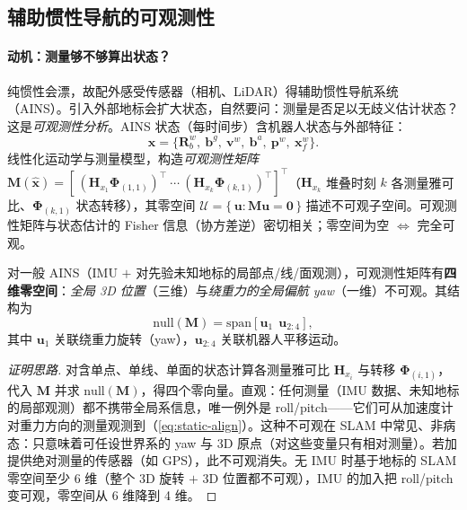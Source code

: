 \subsection{辅助惯性导航的可观测性}
\label{subsec:aided-obs}

\paragraph{动机：测量够不够算出状态？}
纯惯性会漂，故配外感受传感器（相机、LiDAR）得辅助惯性导航系统（AINS）。引入外部地标会扩大状态，自然要问：测量是否足以无歧义估计状态？这是\emph{可观测性分析}\cite{carlone2026handbook}。AINS 状态（每时间步）含机器人状态与外部特征：
\begin{equation}
  \boldsymbol x=\{\mathbf R_b^w,\ \mathbf b^g,\ \mathbf v^w,\ \mathbf b^a,\ \mathbf p^w,\ \boldsymbol x_f^w\}.
  \label{eq:ains-state}
\end{equation}
线性化运动学与测量模型，构造\emph{可观测性矩阵} $\mathbf M(\hat{\boldsymbol x})=[\,(\mathbf H_{x_1}\boldsymbol\Phi_{(1,1)})^\top\ \cdots\ (\mathbf H_{x_k}\boldsymbol\Phi_{(k,1)})^\top]^\top$（$\mathbf H_{x_k}$ 堆叠时刻 $k$ 各测量雅可比、$\boldsymbol\Phi_{(k,1)}$ 状态转移），其零空间 $\mathcal U=\{\,\boldsymbol u:\mathbf M\boldsymbol u=\mathbf 0\,\}$ 描述不可观子空间。可观测性矩阵与状态估计的 Fisher 信息（协方差逆）密切相关；零空间为空 $\iff$ 完全可观。

\begin{theorem}\label{thm:imu-obs}
对一般 AINS（IMU $+$ 对先验未知地标的局部点/线/面观测），可观测性矩阵有\textbf{四维零空间}：\emph{全局 3D 位置}（三维）与\emph{绕重力的全局偏航 yaw}（一维）不可观。其结构为
\[
  \mathrm{null}(\mathbf M)=\mathrm{span}[\boldsymbol u_1\ \ \boldsymbol u_{2:4}],
\]
其中 $\boldsymbol u_1$ 关联绕重力旋转（yaw），$\boldsymbol u_{2:4}$ 关联机器人平移运动\cite{carlone2026handbook}。
\end{theorem}

\begin{proof}[证明思路]
对含单点、单线、单面的状态计算各测量雅可比 $\mathbf H_{x_i}$ 与转移 $\boldsymbol\Phi_{(i,1)}$，代入 $\mathbf M$ 并求 $\mathrm{null}(\mathbf M)$，得四个零向量。直观：任何测量（IMU 数据、未知地标的局部观测）都不携带全局系信息，唯一例外是 roll/pitch——它们可从加速度计对重力方向的测量观测到（\cref{eq:static-align}）。这种不可观在 SLAM 中常见、非病态：只意味着可任设世界系的 yaw 与 3D 原点（对这些变量只有相对测量）。若加提供绝对测量的传感器（如 GPS），此不可观消失。无 IMU 时基于地标的 SLAM 零空间至少 6 维（整个 3D 旋转 $+$ 3D 位置都不可观），IMU 的加入把 roll/pitch 变可观，零空间从 6 维降到 4 维。\cite{carlone2026handbook}
\end{proof}

